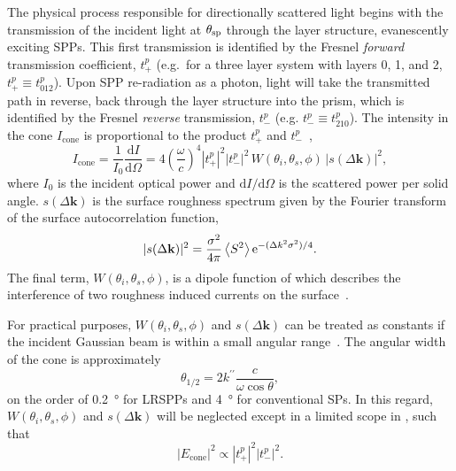 The physical process responsible for directionally scattered light begins
with the transmission of the incident light at $\theta_\mathrm{sp}$ through the layer
structure, evanescently exciting SPPs.  This first transmission is
identified by the Fresnel \textit{forward} transmission coefficient,
$t^p_+$ (e.g.\ for a three layer system with layers 0, 1, and 2, $t^p_+
\equiv t^p_{012}$).  Upon SPP re-radiation as a photon, light will take the
transmitted path in reverse, back through the layer structure into the
prism, which is identified by the Fresnel \textit{reverse} transmission,
$t^p_-$ (e.g.  $t^p_- \equiv t^p_{210}$).  The intensity in the cone
$I_\mathrm{cone}$ is proportional to the product $t^p_+$ and $t^p_-$~\cite{simon1976directional},
\begin{equation}
I_\mathrm{cone} 
= \frac{1}{I_0}\frac{\mathrm{d}I}{\mathrm{d}\Omega} 
= 4 {\left(\frac{\omega}{c}\right)}^4 |t^p_+|^2
|t^p_-|^2\,W(\theta_i,\theta_s,\phi)\, |s(\Delta \mathbf{k})|^2
\label{eqn:guhacone},
\end{equation}
where $I_0$ is the incident optical power and
$\mathrm{d}I/\mathrm{d}\Omega$ is the scattered power per solid angle.
$s(\Delta \mathbf{k})$ is the surface roughness spectrum given by the Fourier
transform of the surface autocorrelation function, 
\begin{equation}
|s(\Delta \mathbf{k})|^2 = \frac{\sigma^2}{4\pi} \left<S^2\right>
{\mathrm{e}}^{-(\Delta k^2 \sigma^2)/4}.
\label{eqn:surfaceroughness}
\end{equation}
The final term, $W(\theta_i,\theta_s,\phi)$, is a dipole function of which
describes the interference of two roughness induced currents on the
surface~\cite{raether1997surface}.

For practical purposes, $W(\theta_i,\theta_s,\phi)$ and $s(\Delta
\mathbf{k})$ can be treated as constants if the incident Gaussian beam is
within a small angular range~\cite{heitmann1977determination}.  The angular
width of the cone is approximately
\begin{equation}
\theta_{1/2} = 2 k^{\prime\prime} \frac{c}{\omega \cos \theta},
\end{equation}
on the order of \SI{0.2}{\degree} for LRSPPs and \SI{4}{\degree} for
conventional SPs.  In this regard, $W(\theta_i,\theta_s,\phi)$ and
$s(\Delta \mathbf{k})$ will be neglected 
except in a limited scope in , such that
\begin{equation}
|E_\mathrm{cone}|^2 \propto	|t^p_+|^2 |t^p_-|^2.
\label{eqn:conefield}
\end{equation}

